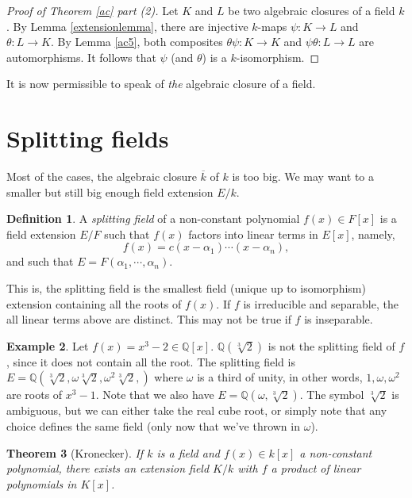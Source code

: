 \documentclass[12pt]{report}
\newtheorem{thm}{Theorem}[section]
\theoremstyle{definition}
\newtheorem{defn}[thm]{Definition}
\newtheorem{example}[thm]{Example}
\def\QQ{\mathbb{Q}}
\def\aa{\alpha}
\begin{document}
\begin{proof}[Proof of Theorem \ref{ac} part (2)]
    Let $K$ and $L$ be two algebraic closures of a field $k$. By Lemma \ref{extensionlemma}, there are injective $k$-maps $\psi : K \to L$ and $\theta : L \to K$. By Lemma \ref{ac5}, both composites $\theta \psi : K \to K$ and $\psi \theta : L \to L$ are automorphisms. It follows that $\psi$ (and $\theta$) is a $k$-isomorphism.
\end{proof}

It is now permissible to speak of \emph{the} algebraic closure of a field.

\section{Splitting fields}

Most of the cases, the algebraic closure $\overline{k}$ of $k$ is too big. We may want to a smaller but still big enough field extension $E/k$.

\begin{defn}
    A \emph{splitting field} of a non-constant polynomial $f(x)\in F[x]$ is a field extension $E/F$ such that $f(x)$ factors into linear terms in $E[x]$, namely, $$f(x)=c(x-\aa_1)\cdots(x-\aa_n),$$
    and such that $E=F(\aa_1,\cdots,\aa_n)$. 
\end{defn}

This is, the splitting field is the smallest field (unique up to isomorphism) extension containing all the roots of $f(x)$. If $f$ is irreducible and separable, the all linear terms above are distinct. This may not be true if $f$ is inseparable.

\begin{example}
    Let $f(x)=x^3-2\in\QQ[x]$. $\QQ(\sqrt[3]{2})$ is not the splitting field of $f$, since it does not contain all the root. The splitting field is $E=\QQ(\sqrt[3]{2},\omega\sqrt[3]{2},\omega^2\sqrt[3]{2},)$ where $\omega$ is a third of unity, in other words, $1,\omega,\omega^2$ are roots of $x^3-1$. Note that we also have $E=\QQ(\omega,\sqrt[3]{2})$. The symbol $\sqrt[3]{2}$ is ambiguous, but we can either take the real cube root, or simply note that any choice defines the same field (only now that we've thrown in $\omega$).
\end{example}

\begin{thm}[Kronecker]
    If $k$ is a field and $f(x)\in k[x]$ a non-constant polynomial, there exists an extension field $K/k$ with $f$ a product of linear polynomials in $K[x]$.
\end{thm}
\end{document}
